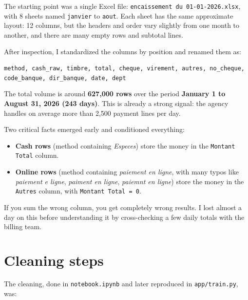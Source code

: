 \documentclass[12pt,a4paper]{report}
\begin{document}
The starting point was a single Excel file: \texttt{encaissement du 01-01-2026.xlsx}, with 8 sheets named \texttt{janvier} to \texttt{aout}. Each sheet has the same approximate layout: 12 columns, but the headers and order vary slightly from one month to another, and there are many empty rows and subtotal lines.

After inspection, I standardized the columns by position and renamed them as:

\begin{center}
\texttt{method, cash\_raw, timbre, total, cheque, virement, autres, no\_cheque, code\_banque, dir\_banque, date, dept}
\end{center}

The total volume is around \textbf{627,000 rows} over the period \textbf{January 1 to August 31, 2026 (243 days)}. This is already a strong signal: the agency handles on average more than 2,500 payment lines per day.

Two critical facts emerged early and conditioned everything:

\begin{itemize}
\item \textbf{Cash rows} (method containing \textit{Especes}) store the money in the \texttt{Montant Total} column.
\item \textbf{Online rows} (method containing \textit{paiement en ligne}, with many typos like \textit{paiement e ligne}, \textit{paiment en ligne}, \textit{paiemnt en ligne}) store the money in the \texttt{Autres} column, with \texttt{Montant Total = 0}.
\end{itemize}

If you sum the wrong column, you get completely wrong results. I lost almost a day on this before understanding it by cross-checking a few daily totals with the billing team.

\section{Cleaning steps}

The cleaning, done in \texttt{notebook.ipynb} and later reproduced in \texttt{app/train.py}, was:
\end{document}
